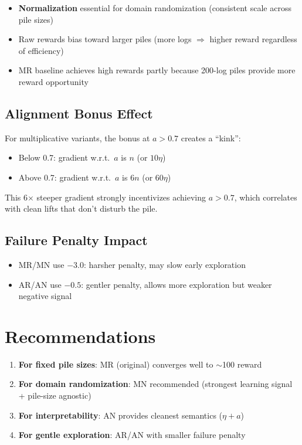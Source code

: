 \documentclass[11pt]{article}
\begin{document}
\begin{itemize}
    \item \textbf{Normalization} essential for domain randomization (consistent scale across pile sizes)
    \item Raw rewards bias toward larger piles (more logs $\Rightarrow$ higher reward regardless of efficiency)
    \item MR baseline achieves high rewards partly because 200-log piles provide more reward opportunity
\end{itemize}

\subsection{Alignment Bonus Effect}

For multiplicative variants, the bonus at $a > 0.7$ creates a ``kink'':
\begin{itemize}
    \item Below 0.7: gradient w.r.t.\ $a$ is $n$ (or $10\eta$)
    \item Above 0.7: gradient w.r.t.\ $a$ is $6n$ (or $60\eta$)
\end{itemize}
This 6$\times$ steeper gradient strongly incentivizes achieving $a > 0.7$, which correlates with clean lifts that don't disturb the pile.

\subsection{Failure Penalty Impact}

\begin{itemize}
    \item MR/MN use $-3.0$: harsher penalty, may slow early exploration
    \item AR/AN use $-0.5$: gentler penalty, allows more exploration but weaker negative signal
\end{itemize}

\section{Recommendations}

\begin{enumerate}
    \item \textbf{For fixed pile sizes}: MR (original) converges well to $\sim$100 reward
    \item \textbf{For domain randomization}: MN recommended (strongest learning signal + pile-size agnostic)
    \item \textbf{For interpretability}: AN provides cleanest semantics ($\eta + a$)
    \item \textbf{For gentle exploration}: AR/AN with smaller failure penalty
\end{enumerate}
\end{document}
